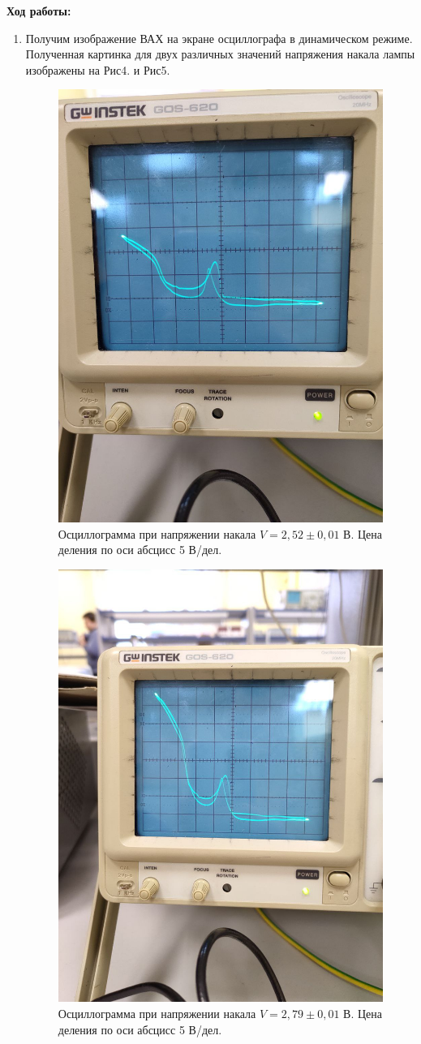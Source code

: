 \documentclass[a4paper, 12pt]{article}%
\begin{document}
	
	\newpage
	
	\textbf{Ход работы: }\\
	
	\begin{enumerate}
	
	\item Получим изображение ВАХ на экране осциллографа в динамическом режиме. Полученная  картинка для двух различных значений напряжения накала лампы изображены на Рис4. и Рис5.
	
	\begin{figure}[H]
		\centering
		\includegraphics[width=0.6\linewidth]{2.519.jpeg}
		\caption{Осциллограмма при напряжении накала $V = 2,52 \pm0,01$ В.  Цена деления по оси абсцисс 5 В/дел.}
	\end{figure}

	\begin{figure}[H]
		\centering
		\includegraphics[width=0.6\linewidth]{2.794.jpeg}
		\caption{Осциллограмма при напряжении накала $V = 2,79 \pm0,01$ В. Цена деления по оси абсцисс 5 В/дел.}
	\end{figure}


\end{enumerate}
\end{document}
